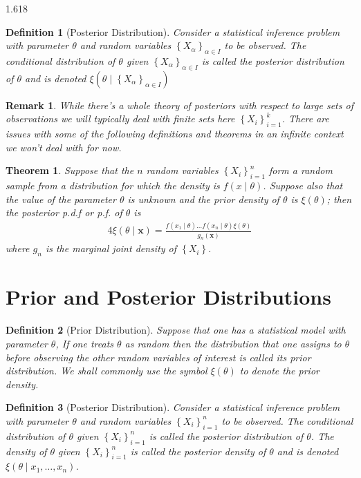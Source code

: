\documentclass[11pt, oneside]{book}   	%
\newtheorem{definition}{Definition}[chapter]
\newtheorem{remark}{Remark}[chapter]
\newtheorem{theorem}{Theorem}[chapter]
\newcommand{\set}[1]{\left\{#1\right\}}
\begin{document}
\begin{spacing}{1.618}
		\begin{definition}[Posterior Distribution]
			Consider a statistical inference problem with parameter $\theta$ and random variables $\set{X_\alpha}_{\alpha\in I}$ to be observed. The conditional distribution of $\theta$ given $\set{X_\alpha}_{\alpha\in I}$ is called the \emph{posterior distribution} of $\theta$ and is denoted $\xi(\theta\mid \set{X_\alpha}_{\alpha\in I})$
		\end{definition}
		
		\begin{remark}
			While there's a whole theory of posteriors with respect to large sets of observations we will typically deal with finite sets here $\set{X_i}_{i=1}^k$. There are issues with some of the following definitions and theorems in an infinite context we won't deal with for now. 
		\end{remark}
		
		\begin{theorem}
			Suppose that the $n$ random variables $\set{X_i}_{i=1}^n$ form a random sample from a distribution for which the density is $f(x\mid\theta)$. Suppose also that the value of the parameter $\theta$ is unknown and the prior density of $\theta$ is $\xi(\theta)$; then the posterior p.d.f or p.f. of $\theta$ is 
			\begin{alignat}{4}
				\xi(\theta\mid \mathbf{x}) = \frac{f(x_1\mid\theta)\dots f(x_n\mid \theta)\xi(\theta)}{g_n(\mathbf{x})}
			\end{alignat}
			where $g_n$ is the marginal joint density of $\set{X_i}$. 
		\end{theorem}
		
	\section{Prior and Posterior Distributions}
		\begin{definition}[Prior Distribution]
			Suppose that one has a statistical model with parameter $\theta$, If one treats $\theta$ as random then the distribution that one assigns to $\theta$ before observing the other random variables of interest is called its \emph{prior distribution}. We shall commonly use the symbol $\xi(\theta)$ to denote the prior density. 	
		\end{definition}
		
		\begin{definition}[Posterior Distribution]
			Consider a statistical inference problem with parameter $\theta$ and random variables $\set{X_i}_{i=1}^n$ to be observed. The conditional distribution of $\theta$ given $\set{X_i}_{i=1}^n$ is called the \emph{posterior distribution} of $\theta$. The density of $\theta$ given $\set{X_i}_{i=1}^n$ is called the \emph{posterior density} of $\theta$ and is denoted $\xi(\theta\mid x_1, \dots, x_n)$. 
		\end{definition}
		

\end{spacing}
\end{document}
